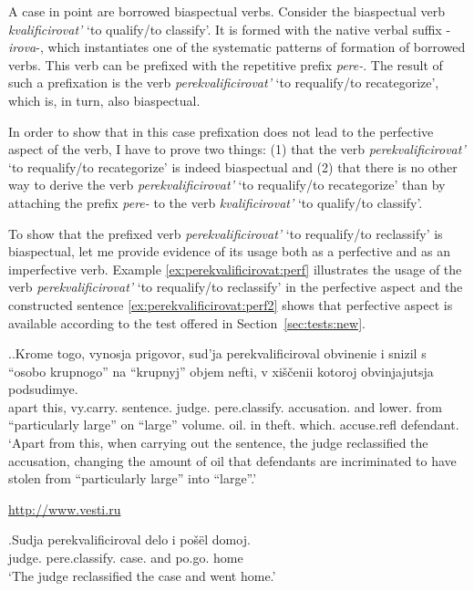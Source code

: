 A case in point are borrowed biaspectual verbs. Consider the biaspectual verb \textit{kvalificirovat'} `to qualify/to classify'. It is formed with the native verbal suffix -\textit{irova}-, which instantiates one of the systematic patterns of formation of borrowed verbs. This verb can be prefixed with the repetitive prefix \textit{pere-}. The result of such a prefixation is the verb \textit{perekvalificirovat'} `to requalify/to recategorize', which is, in turn, also biaspectual.

In order to show that in this case prefixation does not lead to the perfective aspect of the verb, I have to prove two things: (1) that the verb \textit{perekvalificirovat'} `to requalify/to recategorize' is indeed biaspectual and (2) that there is no other way to derive the verb \textit{perekvalificirovat'} `to requalify/to recategorize' than by attaching the prefix \textit{pere-} to the verb \textit{kvalificirovat'} `to qualify/to classify'.

To show that the prefixed verb \textit{perekvalificirovat'} `to requalify/to reclassify' is  biaspectual, let me provide evidence of its usage both as a perfective and as an imperfective verb. Example \ref{ex:perekvalificirovat:perf} illustrates the usage of the verb \textit{perekvalificirovat'} `to requalify/to reclassify' in the perfective aspect and the constructed sentence \ref{ex:perekvalificirovat:perf2} shows that perfective aspect is available according to the test offered in Section~\ref{sec:tests:new}.

\ex.\ag.\label{ex:perekvalificirovat:perf}Krome togo, vynosja prigovor, sud'ja perekvalificiroval obvinenie i snizil s ``osobo krupnogo'' na ``krupnyj'' objem nefti, v xi\v{s}\v{c}enii kotoroj obvinjajutsja podsudimye.\\
apart this, vy.carry. sentence. judge. pere.classify. accusation. and lower. from ``particularly large'' on ``large'' volume. oil. in theft. which. accuse.refl defendant.\\
\vspace{0.5em}
`Apart from this, when carrying out the sentence, the judge reclassified the accusation, changing the amount of oil that defendants are incriminated to have stolen from ``particularly large'' into ``large''.' 
\begin{flushright}
\vspace{-0.5em}
\url{http://www.vesti.ru}
\end{flushright}
\bg.\label{ex:perekvalificirovat:perf2}Sudja perekvalificiroval delo i po\v{s}\"{e}l domoj.\\
judge. pere.classify. case. and po.go. home\\
`The judge reclassified the case and went home.'

